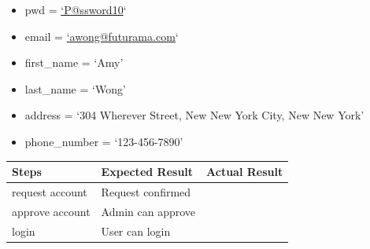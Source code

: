 \documentclass[letterpaper,10pt,english]{sphinxmanual}
\begin{document}
\begin{fulllineitems}
\begin{itemize}
\item {} 
pwd = \href{mailto:'P@ssword10}{`P@ssword10}`

\item {} 
email = \href{mailto:'awong@futurama.com}{`awong@futurama.com}`

\item {} 
first\_name = `Amy'

\item {} 
last\_name = `Wong'

\item {} 
address = `304 Wherever Street, New New York City, New New York'

\item {} 
phone\_number = `123-456-7890'

\end{itemize}

\begin{tabulary}{\linewidth}{|L|L|L|}
\hline
\textsf{\relax 
Steps
} & \textsf{\relax 
Expected Result
} & \textsf{\relax 
Actual Result
}\\
\hline
request account
 & 
Request confirmed
 & \\
\hline
approve account
 & 
Admin can approve
 & \\
\hline
login
 & 
User can login
 & \\
\hline\end{tabulary}


\end{fulllineitems}

\end{document}
